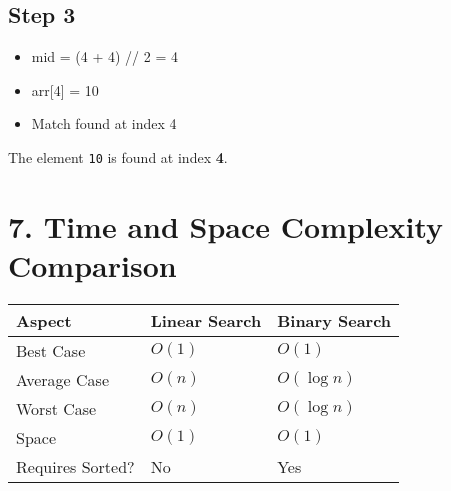 \documentclass[14pt]{extarticle}
\begin{document}
\subsection*{Step 3}
\begin{itemize}
    \item mid = (4 + 4) // 2 = 4
    \item arr[4] = 10
    \item Match found at index 4
\end{itemize}

\begin{tcolorbox}[colback=white, colframe=black, title=Final Result]
The element \texttt{10} is found at index \textbf{4}.
\end{tcolorbox}

\section*{7. Time and Space Complexity Comparison}

\begin{center}
\begin{tabular}{|l|l|l|}
\hline
\textbf{Aspect} & \textbf{Linear Search} & \textbf{Binary Search} \\
\hline
Best Case       & $O(1)$                & $O(1)$ \\
Average Case    & $O(n)$                & $O(\log n)$ \\
Worst Case      & $O(n)$                & $O(\log n)$ \\
\hline
Space           & $O(1)$                & $O(1)$ \\
Requires Sorted?& No                    & Yes \\
\hline
\end{tabular}
\end{center}
\end{document}
